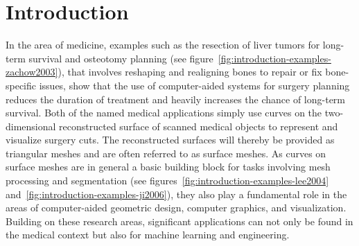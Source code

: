 \documentclass{stdlocal}
\begin{document}
\section{Introduction} %
\label{sec:introduction}


In the area of medicine, examples such as the resection of liver tumors for long-term survival \autocite{alirr2019} and osteotomy planning \autocite{zachow2003} (see figure~\ref{fig:introduction-examples-zachow2003}), that involves reshaping and realigning bones to repair or fix bone-specific issues, show that the use of computer-aided systems for surgery planning reduces the duration of treatment and heavily increases the chance of long-term survival.
Both of the named medical applications simply use curves on the two-dimensional reconstructed surface of scanned medical objects to represent and visualize surgery cuts.
The reconstructed surfaces will thereby be provided as triangular meshes and are often referred to as surface meshes.
As curves on surface meshes are in general a basic building block for tasks involving mesh processing and segmentation \autocite{ji2006,kaplansky2009} (see figures~\ref{fig:introduction-examples-lee2004} and~\ref{fig:introduction-examples-ji2006}), they also play a fundamental role in the areas of computer-aided geometric design, computer graphics, and visualization.
Building on these research areas, significant applications can not only be found in the medical context but also for machine learning \autocite{benhabiles2011,park2019} and engineering.
\end{document}
